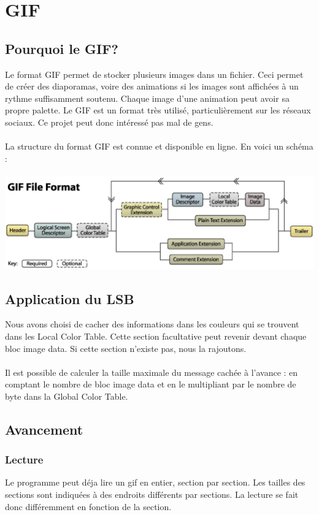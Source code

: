 \section{GIF}

\subsection{Pourquoi le GIF?}
Le format GIF permet de stocker plusieurs images dans un fichier. 
Ceci permet de créer des diaporamas, voire des animations si les images sont affichées à un rythme suffisamment soutenu. 
Chaque image d'une animation peut avoir sa propre palette.
Le GIF est un format très utilisé, particulièrement sur les réseaux sociaux. 
Ce projet peut donc intéressé pas mal de gens. \\\\

La structure du format GIF est connue et disponible en ligne. En voici un schéma : \\\\

\includegraphics[width=15cm]{gif_structure.eps}


\subsection{Application du LSB}
Nous avons choisi de cacher des informations dans les couleurs qui se trouvent dans les Local Color Table. 
Cette section facultative peut revenir devant chaque bloc image data. Si cette section n'existe pas, nous la rajoutons.\\\\

Il est possible de calculer la taille maximale du message cachée à l'avance : 
en comptant le nombre de bloc image data et en le multipliant par le nombre de byte dans la Global Color Table.


\subsection{Avancement}
\subsubsection{Lecture}
Le programme peut déja lire un gif en entier, section par section. 
Les tailles des sections sont indiquées à des endroits différents par sections. 
La lecture se fait donc différemment en fonction de la section.\\\\


